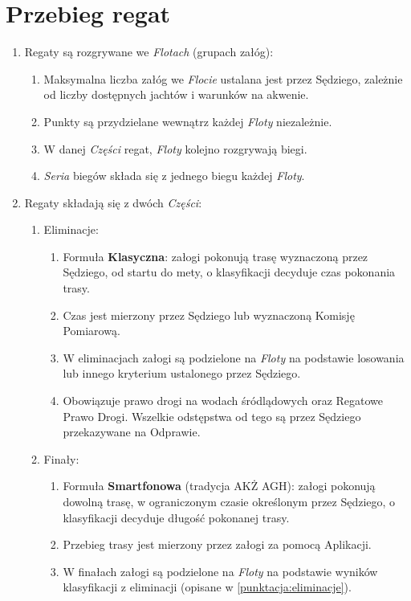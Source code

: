 \documentclass[12pt,a4paper]{article}
\begin{document}
\section{Przebieg regat}
\begin{enumerate}
    \item Regaty są rozgrywane we \textit{Flotach} (grupach załóg):
    \begin{enumerate}
        \item Maksymalna liczba załóg we \textit{Flocie} ustalana jest przez Sędziego, zależnie od liczby dostępnych jachtów i warunków na akwenie.
        \item Punkty są przydzielane wewnątrz każdej \textit{Floty} niezależnie.
        \item W danej \textit{Części} regat, \textit{Floty} kolejno rozgrywają biegi.
        \item \textit{Seria} biegów składa się z jednego biegu każdej \textit{Floty}.
    \end{enumerate}
    \item Regaty składają się z dwóch \textit{Części}:
    \begin{enumerate}
        \item Eliminacje:
        \begin{enumerate}
            \item Formuła \textbf{Klasyczna}: załogi pokonują trasę wyznaczoną przez Sędziego, od startu do mety, o klasyfikacji decyduje czas pokonania trasy.
            \item Czas jest mierzony przez Sędziego lub wyznaczoną Komisję Pomiarową.
            \item W eliminacjach załogi są podzielone na \textit{Floty} na podstawie losowania lub innego kryterium ustalonego przez Sędziego.
            \item Obowiązuje prawo drogi na wodach śródlądowych oraz Regatowe Prawo Drogi. Wszelkie odstępstwa od tego są przez Sędziego przekazywane na Odprawie. 
        \end{enumerate}
        \item Finały:
        \begin{enumerate}
            \item Formuła \textbf{Smartfonowa} (tradycja AKŻ AGH): załogi pokonują dowolną trasę, w ograniczonym czasie określonym przez Sędziego, o klasyfikacji decyduje długość pokonanej trasy.
            \item Przebieg trasy jest mierzony przez załogi za pomocą Aplikacji.
            \item W finałach załogi są podzielone na \textit{Floty} na podstawie wyników klasyfikacji z eliminacji (opisane w \ref{punktacja:eliminacje}).

\end{enumerate}
\end{enumerate}
\end{enumerate}
\end{document}
